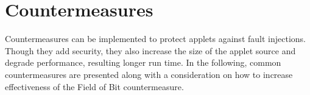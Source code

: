 \section{Countermeasures}\label{sub:faultCounter}
Countermeasures can be implemented to protect applets against fault injections. 
Though they add security, they also increase the size of the applet source and degrade performance, resulting longer run time. In the following, common countermeasures are presented along with a consideration on how to increase effectiveness of the Field of Bit countermeasure.





